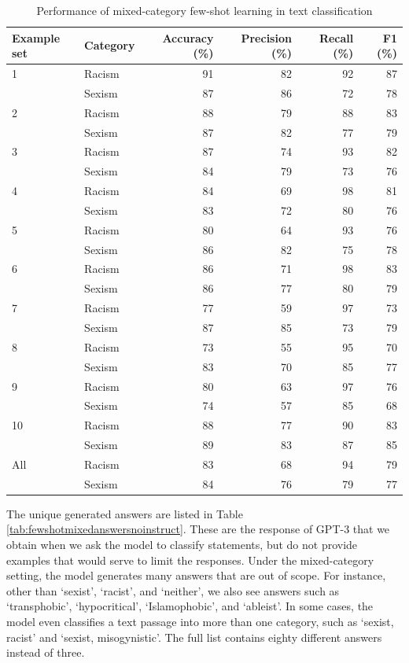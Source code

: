 \documentclass[12pt,]{article}
\begin{document}
\begin{table}

\caption{\label{tab:fewshotmixed-summary}Performance of mixed-category few-shot learning in text classification}
\centering
\begin{tabular}[t]{llrrrr}
\toprule
Example set & Category & Accuracy (\%) & Precision (\%) & Recall (\%) & F1 (\%)\\
\midrule
1 & Racism & 91 & 82 & 92 & 87\\
 & Sexism & 87 & 86 & 72 & 78\\
\midrule
2 & Racism & 88 & 79 & 88 & 83\\
 & Sexism & 87 & 82 & 77 & 79\\
\midrule
3 & Racism & 87 & 74 & 93 & 82\\
 & Sexism & 84 & 79 & 73 & 76\\
\midrule
4 & Racism & 84 & 69 & 98 & 81\\
 & Sexism & 83 & 72 & 80 & 76\\
\midrule
5 & Racism & 80 & 64 & 93 & 76\\
 & Sexism & 86 & 82 & 75 & 78\\
\midrule
6 & Racism & 86 & 71 & 98 & 83\\
 & Sexism & 86 & 77 & 80 & 79\\
\midrule
7 & Racism & 77 & 59 & 97 & 73\\
 & Sexism & 87 & 85 & 73 & 79\\
\midrule
8 & Racism & 73 & 55 & 95 & 70\\
 & Sexism & 83 & 70 & 85 & 77\\
\midrule
9 & Racism & 80 & 63 & 97 & 76\\
 & Sexism & 74 & 57 & 85 & 68\\
\midrule
10 & Racism & 88 & 77 & 90 & 83\\
 & Sexism & 89 & 83 & 87 & 85\\
\midrule
All & Racism & 83 & 68 & 94 & 79\\
 & Sexism & 84 & 76 & 79 & 77\\
\bottomrule
\end{tabular}
\end{table}

The unique generated answers are listed in Table \ref{tab:fewshotmixedanswersnoinstruct}. These are the response of GPT-3 that we obtain when we ask the model to classify statements, but do not provide examples that would serve to limit the responses. Under the mixed-category setting, the model generates many answers that are out of scope. For instance, other than `sexist', `racist', and `neither', we also see answers such as `transphobic', `hypocritical', `Islamophobic', and `ableist'. In some cases, the model even classifies a text passage into more than one category, such as `sexist, racist' and `sexist, misogynistic'. The full list contains eighty different answers instead of three.
\end{document}
